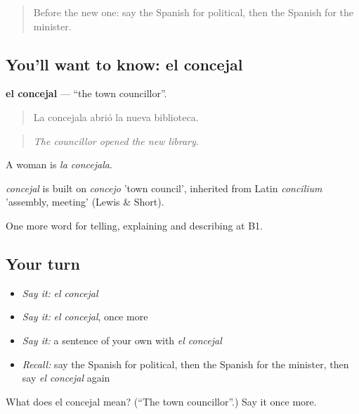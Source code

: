 \label{lesson:ES-C601-concejal}



\begin{quote}
Before the new one: say the Spanish for political, then the Spanish for the minister.
\end{quote}

\subsection*{You'll want to know: el concejal}
\textbf{el concejal} — \textquotedblleft{}the town councillor\textquotedblright{}.

\begin{quote}
La concejala abrió la nueva biblioteca.
\end{quote}

\begin{quote}
\emph{The councillor opened the new library.}
\end{quote}

A woman is \emph{la concejala}.

\begin{cousinweb}
\emph{concejal} is built on \emph{concejo} 'town council', inherited from Latin \emph{concilium} 'assembly, meeting' (Lewis \& Short).
\end{cousinweb}

\begin{grammarlens}[title={What you've built}]
One more word for telling, explaining and describing at B1.
\end{grammarlens}

\subsection*{Your turn}
\begin{itemize}
\raggedright
  \item \emph{Say it:} \emph{el concejal}
  \item \emph{Say it:} \emph{el concejal}, once more
  \item \emph{Say it:} a sentence of your own with \emph{el concejal}
  \item \emph{Recall:} say the Spanish for political, then the Spanish for the minister, then say \emph{el concejal} again
\end{itemize}

\begin{tcolorbox}[breakable,colback=teal!4,colframe=teal!35!black,title={Before you move on}]
What does el concejal mean? (\textquotedblleft{}The town councillor\textquotedblright{}.) Say it once more.
\end{tcolorbox}
